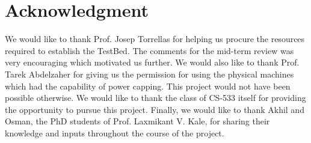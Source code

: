 \documentclass[10pt, conference, compsocconf]{IEEEtran}
\begin{document}
\section*{Acknowledgment}
We would like to thank Prof. Josep Torrellas for helping us procure the
resources required to establish the TestBed. The comments for the mid-term
review was very encouraging which motivated us further. We would also like to
thank Prof. Tarek Abdelzaher for giving us the permission for using the
physical machines which had the capability of power capping. This project would
not have been possible otherwise. We would like to thank the class of CS-533
itself for providing the opportunity to pursue this project. Finally, we would
like to thank Akhil and Osman, the PhD students of Prof. Laxmikant V. Kale, for
sharing their knowledge and inputs throughout the course of the project.

 
\end{document}
